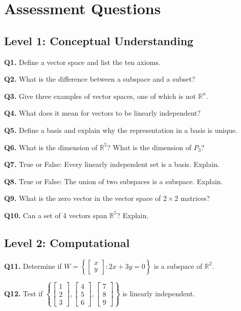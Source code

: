 \documentclass[12pt,a4paper]{article}
\theoremstyle{definition}
\begin{document}
\section{Assessment Questions}

\subsection{Level 1: Conceptual Understanding}

\textbf{Q1.} Define a vector space and list the ten axioms.

\textbf{Q2.} What is the difference between a subspace and a subset?

\textbf{Q3.} Give three examples of vector spaces, one of which is not $\mathbb{R}^n$.

\textbf{Q4.} What does it mean for vectors to be linearly independent?

\textbf{Q5.} Define a basis and explain why the representation in a basis is unique.

\textbf{Q6.} What is the dimension of $\mathbb{R}^{5}$? What is the dimension of $P_3$?

\textbf{Q7.} True or False: Every linearly independent set is a basis. Explain.

\textbf{Q8.} True or False: The union of two subspaces is a subspace. Explain.

\textbf{Q9.} What is the zero vector in the vector space of $2 \times 2$ matrices?

\textbf{Q10.} Can a set of 4 vectors span $\mathbb{R}^5$? Explain.

\subsection{Level 2: Computational}

\textbf{Q11.} Determine if $W = \left\{\begin{bmatrix} x \\ y \end{bmatrix} : 2x + 3y = 0\right\}$ is a subspace of $\mathbb{R}^2$.

\textbf{Q12.} Test if $\left\{\begin{bmatrix} 1 \\ 2 \\ 3 \end{bmatrix}, \begin{bmatrix} 4 \\ 5 \\ 6 \end{bmatrix}, \begin{bmatrix} 7 \\ 8 \\ 9 \end{bmatrix}\right\}$ is linearly independent.
\end{document}
